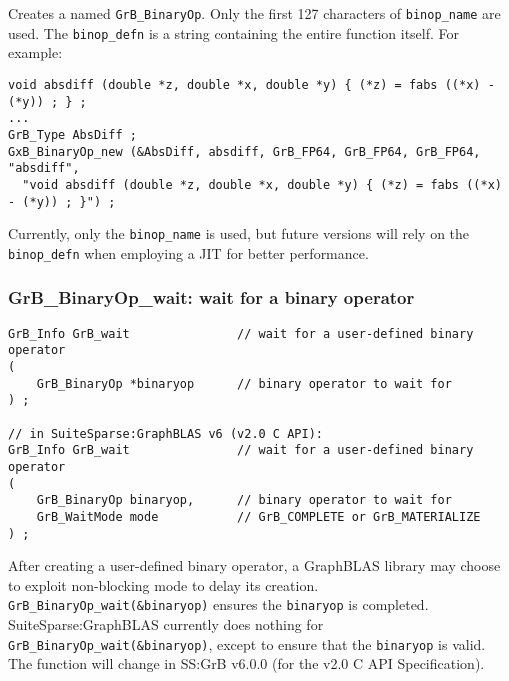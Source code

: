 \documentclass[12pt]{article}
\begin{document}
Creates a named \verb'GrB_BinaryOp'.  Only the first 127 characters of
\verb'binop_name' are used.  The \verb'binop_defn' is a string containing the
entire function itself.  For example:

{\footnotesize
\begin{verbatim}
void absdiff (double *z, double *x, double *y) { (*z) = fabs ((*x) - (*y)) ; } ;
...
GrB_Type AbsDiff ;
GxB_BinaryOp_new (&AbsDiff, absdiff, GrB_FP64, GrB_FP64, GrB_FP64, "absdiff",
  "void absdiff (double *z, double *x, double *y) { (*z) = fabs ((*x) - (*y)) ; }") ; \end{verbatim}}

Currently, only the \verb'binop_name' is used, but future versions will
rely on the \verb'binop_defn' when employing a JIT for better performance.

\newpage
\subsubsection{{\sf GrB\_BinaryOp\_wait:} wait for a binary operator}
\label{binaryop_wait}

\begin{mdframed}[userdefinedwidth=6in]
{\footnotesize
\begin{verbatim}
GrB_Info GrB_wait               // wait for a user-defined binary operator
(
    GrB_BinaryOp *binaryop      // binary operator to wait for
) ;

// in SuiteSparse:GraphBLAS v6 (v2.0 C API):
GrB_Info GrB_wait               // wait for a user-defined binary operator
(
    GrB_BinaryOp binaryop,      // binary operator to wait for
    GrB_WaitMode mode           // GrB_COMPLETE or GrB_MATERIALIZE
) ;
\end{verbatim}
}\end{mdframed}

After creating a user-defined binary operator, a GraphBLAS library may choose
to exploit non-blocking mode to delay its creation.
\verb'GrB_BinaryOp_wait(&binaryop)' ensures the \verb'binaryop' is completed.
SuiteSparse:GraphBLAS currently does nothing for
\verb'GrB_BinaryOp_wait(&binaryop)', except to ensure that the \verb'binaryop'
is valid.
The function will change in SS:GrB v6.0.0 (for the v2.0 C API Specification).

\end{document}
